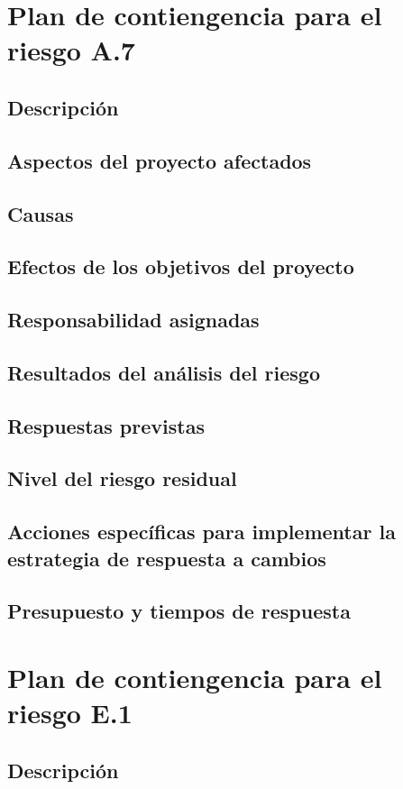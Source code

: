 \documentclass[11pt,a4paper,spanish,twoside]{book}
\begin{document}
\section{Plan de contiengencia para el riesgo A.7}
\subsection{Descripción}
\subsection{Aspectos del proyecto afectados}
\subsection{Causas}
\subsection{Efectos de los objetivos del proyecto}
\subsection{Responsabilidad asignadas}
\subsection{Resultados del análisis del riesgo}
\subsection{Respuestas previstas}
\subsection{Nivel del riesgo residual}
\subsection{Acciones específicas para implementar la estrategia de respuesta
a cambios}
\subsection{Presupuesto y tiempos de respuesta}

\section{Plan de contiengencia para el riesgo E.1}
\subsection{Descripción}
\end{document}

